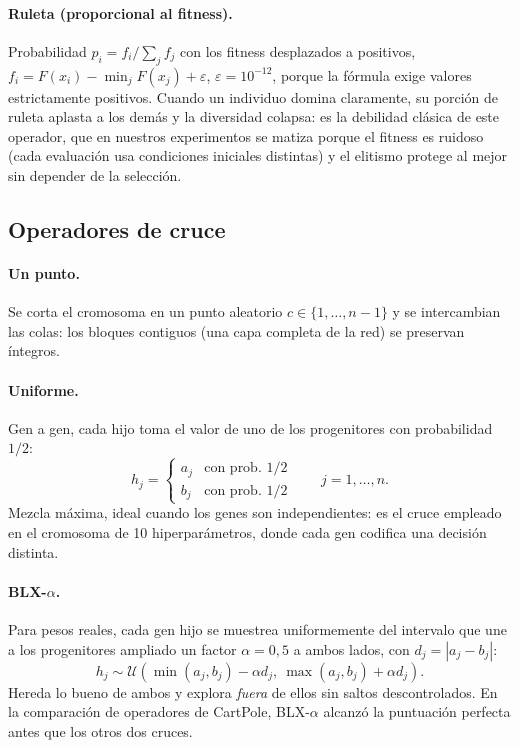 \paragraph{Ruleta (proporcional al fitness).}
Probabilidad $p_i = f_i / \sum_j f_j$ con los fitness desplazados a positivos, $f_i = F(x_i) - \min_j F(x_j) + \varepsilon$, $\varepsilon = 10^{-12}$, porque la fórmula exige valores estrictamente positivos. Cuando un individuo domina claramente, su porción de ruleta aplasta a los demás y la diversidad colapsa: es la debilidad clásica de este operador, que en nuestros experimentos se matiza porque el fitness es ruidoso (cada evaluación usa condiciones iniciales distintas) y el elitismo protege al mejor sin depender de la selección.

\subsection{Operadores de cruce}

\paragraph{Un punto.}
Se corta el cromosoma en un punto aleatorio $c \in \{1,\dots,n-1\}$ y se intercambian las colas: los bloques contiguos (una capa completa de la red) se preservan íntegros.

\paragraph{Uniforme.}
Gen a gen, cada hijo toma el valor de uno de los progenitores con probabilidad $1/2$:
\begin{equation}
  h_j = \begin{cases} a_j & \text{con prob. } 1/2 \\ b_j & \text{con prob. } 1/2 \end{cases}
  \qquad j = 1,\dots,n.
\end{equation}
Mezcla máxima, ideal cuando los genes son independientes: es el cruce empleado en el cromosoma de 10 hiperparámetros, donde cada gen codifica una decisión distinta.

\paragraph{BLX-$\alpha$.}
Para pesos reales, cada gen hijo se muestrea uniformemente del intervalo que une a los progenitores ampliado un factor $\alpha = 0{,}5$ a ambos lados, con $d_j = |a_j - b_j|$:
\begin{equation}
  h_j \sim \mathcal{U}\!\left( \min(a_j, b_j) - \alpha d_j,\ \max(a_j, b_j) + \alpha d_j \right).
\end{equation}
Hereda lo bueno de ambos y explora \emph{fuera} de ellos sin saltos descontrolados. En la comparación de operadores de CartPole, BLX-$\alpha$ alcanzó la puntuación perfecta antes que los otros dos cruces.

